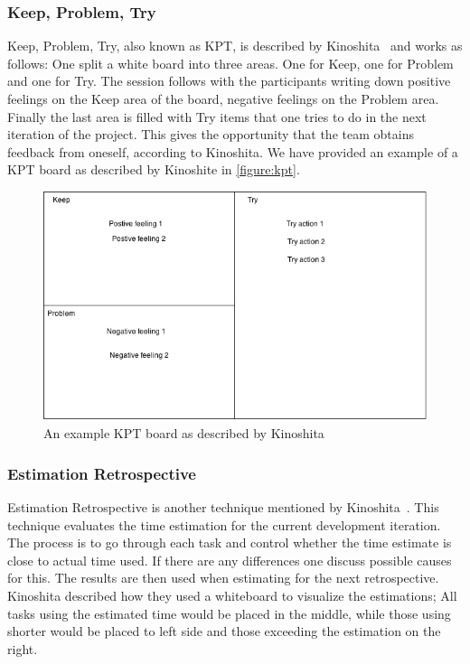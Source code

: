 \documentclass[12pt]{article}
\begin{document}
\subsubsection{Keep, Problem, Try}
Keep, Problem, Try, also known as KPT, is described by Kinoshita~\cite{Kinoshita2008} and works as follows: One split a white board into three areas. One for Keep, one for Problem and one for Try. The session follows with the participants writing down positive feelings on the Keep area of the board, negative feelings on the Problem area. Finally the last area is filled with Try items that one tries to do in the next iteration of the project. This gives the opportunity that the team obtains feedback from oneself, according to Kinoshita. We have provided an example of a KPT board as described by Kinoshite in \autoref{figure:kpt}. 

\begin{figure}[h!]
	\centering
	\includegraphics[width=\textwidth]{figures/kpt.png}
	\caption{An example KPT board as described by Kinoshita ~\cite{Kinoshita2008}}
	\label{figure:kpt}
\end{figure}

\subsubsection{Estimation Retrospective}
Estimation Retrospective is another technique mentioned by Kinoshita~\cite{Kinoshita2008}. This technique evaluates the time estimation for the current development iteration. The process is to go through each task and control whether the time estimate is close to actual time used. If there are any differences one discuss possible causes for this. The results are then used when estimating for the next retrospective. Kinoshita described how they used a whiteboard to visualize the estimations; All tasks using the estimated time would be placed in the middle, while those using shorter would be placed to left side and those exceeding the estimation on the right. 
\end{document}
